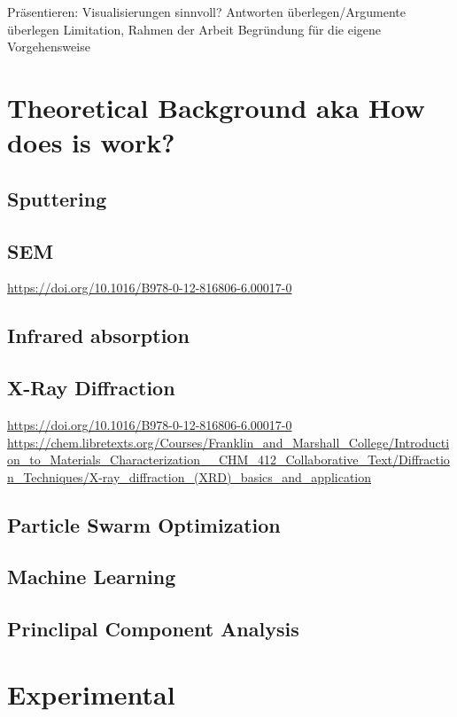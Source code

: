 \documentclass[a4paper]{article}
\begin{document}
Präsentieren: Visualisierungen sinnvoll? 
Antworten überlegen/Argumente überlegen
Limitation, Rahmen der Arbeit
Begründung für die eigene Vorgehensweise
\fi
\section{Theoretical Background aka How does is work?}
\subsection{Sputtering}
\subsection{SEM}
\url{https://doi.org/10.1016/B978-0-12-816806-6.00017-0}\\
\subsection{Infrared absorption}
\subsection{X-Ray Diffraction}
\url{https://doi.org/10.1016/B978-0-12-816806-6.00017-0}\\
\url{https://chem.libretexts.org/Courses/Franklin_and_Marshall_College/Introduction_to_Materials_Characterization__CHM_412_Collaborative_Text/Diffraction_Techniques/X-ray_diffraction_(XRD)_basics_and_application}\\
\subsection{Particle Swarm Optimization}
\subsection{Machine Learning}
\subsection{Princlipal Component Analysis}

\clearpage
\section{Experimental}
\label{sec:exp}
\end{document}

